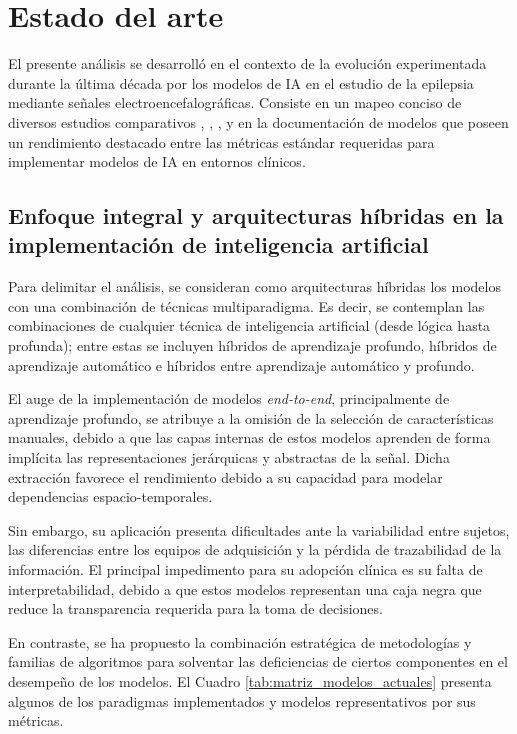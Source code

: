 \chapter{Estado del arte}
El presente análisis se desarrolló en el contexto de la evolución experimentada durante la última década por los modelos de IA en el estudio de la epilepsia mediante señales electroencefalográficas. Consiste en un mapeo conciso de diversos estudios comparativos \cite{wu_review_2025}, \cite{craik2019deep}, \cite{slamaComprehensiveReviewMachine2025}, y en la documentación de modelos que poseen un rendimiento destacado entre las métricas estándar requeridas para implementar modelos de IA en entornos clínicos.

\section{Enfoque integral y arquitecturas híbridas en la implementación de inteligencia artificial}
Para delimitar el análisis, se consideran como arquitecturas híbridas los modelos con una combinación de técnicas multiparadigma. Es decir, se contemplan las combinaciones de cualquier técnica de inteligencia artificial (desde lógica hasta profunda); entre estas se incluyen híbridos de aprendizaje profundo, híbridos de aprendizaje automático e híbridos entre aprendizaje automático y profundo. 

El auge de la implementación de modelos \textit{end-to-end}, principalmente de aprendizaje profundo, se atribuye a la omisión de la selección de características manuales, debido a que las capas internas de estos modelos aprenden de forma implícita las representaciones jerárquicas y abstractas de la señal. Dicha extracción favorece el rendimiento debido a su capacidad para modelar dependencias espacio-temporales. 

Sin embargo, su aplicación presenta dificultades ante la variabilidad entre sujetos, las diferencias entre los equipos de adquisición y la pérdida de trazabilidad de la información. El principal impedimento para su adopción clínica es su falta de interpretabilidad, debido a que estos modelos representan una caja negra que reduce la transparencia requerida para la toma de decisiones.

En contraste, se ha propuesto la combinación estratégica de metodologías y familias de algoritmos para solventar las deficiencias de ciertos componentes en el desempeño de los modelos. El Cuadro \ref{tab:matriz_modelos_actuales} presenta algunos de los paradigmas implementados y modelos representativos por sus métricas.

